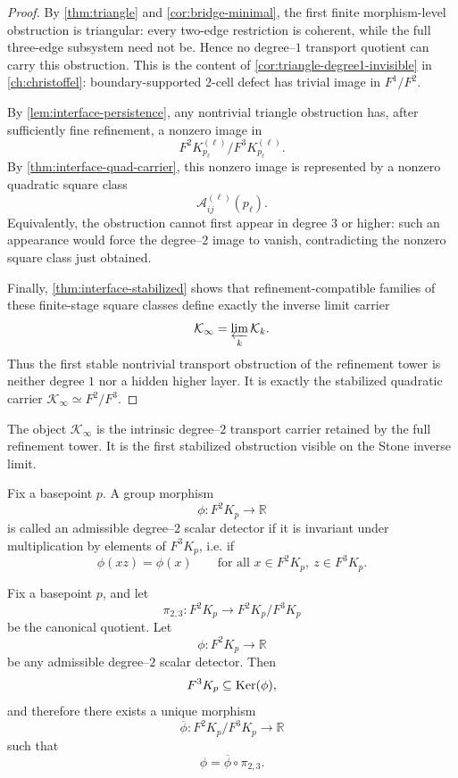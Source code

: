 \begin{proof}
	By \cref{thm:triangle} and \cref{cor:bridge-minimal}, the first finite
	morphism-level obstruction is triangular: every two-edge restriction is
	coherent, while the full three-edge subsystem need not be.  Hence no
	degree--\(1\) transport quotient can carry this obstruction.  This is the
	content of \cref{cor:triangle-degree1-invisible} in
	\cref{ch:christoffel}: boundary-supported \(2\)-cell defect has trivial
	image in \(F^1/F^2\).

	By \cref{lem:interface-persistence}, any nontrivial triangle obstruction
	has, after sufficiently fine refinement, a nonzero image in
	\[
		F^2K_{p_\ell}^{(\ell)}/F^3K_{p_\ell}^{(\ell)}.
	\]
	By \cref{thm:interface-quad-carrier}, this nonzero image is represented
	by a nonzero quadratic square class
	\[
		\mathcal A_{ij}^{(\ell)}(p_\ell).
	\]
	Equivalently, the obstruction cannot first appear in degree \(3\) or
	higher: such an appearance would force the degree--\(2\) image to vanish,
	contradicting the nonzero square class just obtained.

	Finally, \cref{thm:interface-stabilized} shows that refinement-compatible
	families of these finite-stage square classes define exactly the inverse
	limit carrier
	\[
		\mathcal K_\infty=\varprojlim_k\mathcal K_k.
	\]
	Thus the first stable nontrivial transport obstruction of the refinement
	tower is neither degree \(1\) nor a hidden higher layer.  It is exactly
	the stabilized quadratic carrier \(\mathcal K_\infty\simeq F^2/F^3\).
\end{proof}
\begin{remark}
	The object \(\mathcal K_\infty\) is the intrinsic degree--\(2\)
	transport carrier retained by the full refinement tower.
	It is the first stabilized obstruction visible on the Stone inverse
	limit.
\end{remark}
\begin{definition}
	\label{def:interface-admissible-scalar}
	Fix a basepoint \(p\). A group morphism
	\[
		\phi:F^2K_p\to \mathbb R
	\]
	is called an admissible degree--\(2\) scalar detector if it is invariant
	under multiplication by elements of \(F^3K_p\), i.e. if
	\[
		\phi(xz)=\phi(x)
		\qquad
		\text{for all }x\in F^2K_p,\ z\in F^3K_p.
	\]
\end{definition}
\begin{theorem}
	\label{thm:kernel-annihilation-upstream}
	Fix a basepoint \(p\), and let
	\[
		\pi_{2,3}:F^2K_p\to F^2K_p/F^3K_p
	\]
	be the canonical quotient.
	Let
	\[
		\phi:F^2K_p\to \mathbb R
	\]
	be any admissible degree--\(2\) scalar detector.
	Then
	\[
		F^3K_p\subseteq \operatorname{Ker}(\phi),
	\]
	and therefore there exists a unique morphism
	\[
		\overline\phi:F^2K_p/F^3K_p\to\mathbb R
	\]
	such that
	\[
		\phi=\overline\phi\circ \pi_{2,3}.
	\]
\end{theorem}
